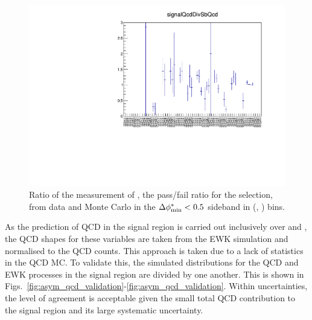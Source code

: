 \begin{figure}[h!]
  \begin{center}        
    \includegraphics[width=\textwidth]{figures/qcd/plots/doubleQcdSbSrRatio1D}
    \caption{ Ratio of the measurement of \rmhtmet, the pass/fail ratio for the \mhtmet selection, from data and Monte Carlo in the $\mbox{$\Delta\phi^{*}_{\rm min}$} < 0.5$ sideband in (\scalht, \njet) bins.  
    }

    \label{fig:RR_qcd}
  \end{center} 
\end{figure}

As the prediction of QCD in the signal region is carried out
inclusively over \nb and \mht, the QCD shapes for these variables are
taken from the EWK simulation and normalised to the QCD counts. 
This approach is taken due to a lack of statistics in
the QCD MC. To validate this, the simulated \mht distributions
for the QCD and EWK processes in the signal region are divided by one
another. This is shown in
Figs.~\ref{fig:asym_qcd_validation}-\ref{fig:asym_qcd_validation}.
Within uncertainties, the level of agreement is acceptable given the
small total QCD contribution to the signal region and its large
systematic uncertainty. 

